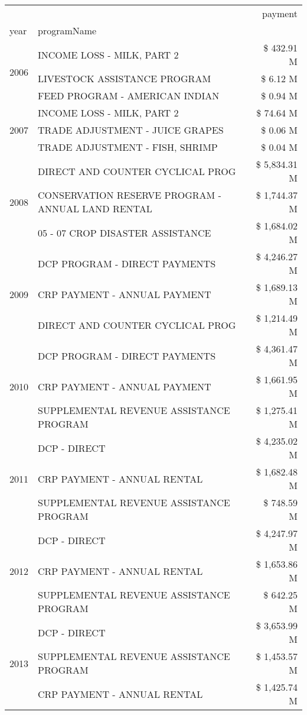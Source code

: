\begin{tabular}{llr}
\toprule
 &  & payment \\
year & programName &  \\
\midrule
\multirow[t]{3}{*}{2006} & INCOME LOSS - MILK, PART 2 & \$ 432.91 M \\
 & LIVESTOCK ASSISTANCE PROGRAM & \$ 6.12 M \\
 & FEED PROGRAM - AMERICAN INDIAN & \$ 0.94 M \\
\cline{1-3}
\multirow[t]{3}{*}{2007} & INCOME LOSS - MILK, PART 2 & \$ 74.64 M \\
 & TRADE ADJUSTMENT - JUICE GRAPES & \$ 0.06 M \\
 & TRADE ADJUSTMENT - FISH, SHRIMP & \$ 0.04 M \\
\cline{1-3}
\multirow[t]{3}{*}{2008} & DIRECT AND COUNTER CYCLICAL PROG & \$ 5,834.31 M \\
 & CONSERVATION RESERVE PROGRAM - ANNUAL LAND RENTAL & \$ 1,744.37 M \\
 & 05 - 07 CROP DISASTER ASSISTANCE & \$ 1,684.02 M \\
\cline{1-3}
\multirow[t]{3}{*}{2009} & DCP PROGRAM - DIRECT PAYMENTS & \$ 4,246.27 M \\
 & CRP PAYMENT - ANNUAL PAYMENT & \$ 1,689.13 M \\
 & DIRECT AND COUNTER CYCLICAL PROG & \$ 1,214.49 M \\
\cline{1-3}
\multirow[t]{3}{*}{2010} & DCP PROGRAM - DIRECT PAYMENTS & \$ 4,361.47 M \\
 & CRP PAYMENT - ANNUAL PAYMENT & \$ 1,661.95 M \\
 & SUPPLEMENTAL REVENUE ASSISTANCE PROGRAM & \$ 1,275.41 M \\
\cline{1-3}
\multirow[t]{3}{*}{2011} & DCP - DIRECT & \$ 4,235.02 M \\
 & CRP PAYMENT - ANNUAL RENTAL & \$ 1,682.48 M \\
 & SUPPLEMENTAL REVENUE ASSISTANCE PROGRAM & \$ 748.59 M \\
\cline{1-3}
\multirow[t]{3}{*}{2012} & DCP - DIRECT & \$ 4,247.97 M \\
 & CRP PAYMENT - ANNUAL RENTAL & \$ 1,653.86 M \\
 & SUPPLEMENTAL REVENUE ASSISTANCE PROGRAM & \$ 642.25 M \\
\cline{1-3}
\multirow[t]{3}{*}{2013} & DCP - DIRECT & \$ 3,653.99 M \\
 & SUPPLEMENTAL REVENUE ASSISTANCE PROGRAM & \$ 1,453.57 M \\
 & CRP PAYMENT - ANNUAL RENTAL & \$ 1,425.74 M \\

\end{tabular}
